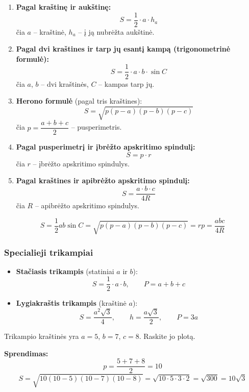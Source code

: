 \begin{enumerate}
    \item \textbf{Pagal kraštinę ir aukštinę:}
    \[
    S = \frac{1}{2} \cdot a \cdot h_a
    \]
    čia $a$ – kraštinė, $h_a$ – į ją nubrėžta aukštinė.

    \item \textbf{Pagal dvi kraštines ir tarp jų esantį kampą (trigonometrinė formulė):}
    \[
    S = \frac{1}{2} \cdot a \cdot b \cdot \sin C
    \]
    čia $a$, $b$ – dvi kraštinės, $C$ – kampas tarp jų.

    \item \textbf{Herono formulė} (pagal tris kraštines):
    \[
    S = \sqrt{p(p-a)(p-b)(p-c)}
    \]
    čia $p = \dfrac{a+b+c}{2}$ – pusperimetris.

    \item \textbf{Pagal pusperimetrį ir įbrėžto apskritimo spindulį:}
    \[
    S = p \cdot r
    \]
    čia $r$ – įbrėžto apskritimo spindulys.

    \item \textbf{Pagal kraštines ir apibrėžto apskritimo spindulį:}
    \[
    S = \frac{a \cdot b \cdot c}{4R}
    \]
    čia $R$ – apibrėžto apskritimo spindulys.
\end{enumerate}

\begin{tcolorbox}[title={VBE formulyno trikampio suvestinė}]
\[
S = \frac{1}{2}ab\sin C = \sqrt{p(p-a)(p-b)(p-c)} = rp = \frac{abc}{4R}
\]
\end{tcolorbox}

\subsubsection*{Specialieji trikampiai}

\begin{itemize}
    \item \textbf{Stačiasis trikampis} (statiniai $a$ ir $b$):
    \[
    S = \frac{1}{2} \cdot a \cdot b, \qquad P = a + b + c
    \]

    \item \textbf{Lygiakraštis trikampis} (kraštinė $a$):
    \[
    S = \frac{a^2\sqrt{3}}{4}, \qquad h = \frac{a\sqrt{3}}{2}, \qquad P = 3a
    \]
\end{itemize}

\begin{example}
Trikampio kraštinės yra $a = 5$, $b = 7$, $c = 8$. Raskite jo plotą.

\textbf{Sprendimas:}
\[
p = \frac{5+7+8}{2} = 10
\]
\[
S = \sqrt{10(10-5)(10-7)(10-8)} = \sqrt{10 \cdot 5 \cdot 3 \cdot 2} = \sqrt{300} = 10\sqrt{3}
\]
\end{example}

